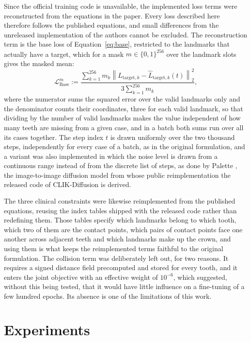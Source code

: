 \documentclass[10pt,a4paper]{article}
\begin{document}
Since the official training code is unavailable, the implemented loss terms were reconstructed from the equations in the paper. Every loss described here therefore follows the published equations, and small differences from the unreleased implementation of the authors cannot be excluded. The reconstruction term is the base loss of Equation~\eqref{eq:base}, restricted to the landmarks that actually have a target, which for a mask $m \in \{0,1\}^{256}$ over the landmark slots gives the masked mean:
\begin{equation}
\mathcal{L}^{m}_{\text{Base}} := \frac{\sum_{k=1}^{256} m_k \left\lVert L_{\text{target},k} - \hat{L}_{\text{target},k}(t)\right\rVert_2^2}{3\sum_{k=1}^{256} m_k},
\end{equation}
where the numerator sums the squared error over the valid landmarks only and the denominator counts their coordinates, three for each valid landmark, so that dividing by the number of valid landmarks makes the value independent of how many teeth are missing from a given case, and in a batch both sums run over all its cases together. The step index $t$ is drawn uniformly over the two thousand steps, independently for every case of a batch, as in the original formulation, and a variant was also implemented in which the noise level is drawn from a continuous range instead of from the discrete list of steps, as done by Palette \citep{saharia2022palette}, the image-to-image diffusion model from whose public reimplementation the released code of CLIK-Diffusion is derived.

The three clinical constraints were likewise reimplemented from the published equations, reusing the index tables shipped with the released code rather than redefining them. Those tables specify which landmarks belong to which tooth, which two of them are the contact points, which pairs of contact points face one another across adjacent teeth and which landmarks make up the crown, and using them is what keeps the reimplemented terms faithful to the original formulation. The collision term was deliberately left out, for two reasons. It requires a signed distance field precomputed and stored for every tooth, and it enters the joint objective with an effective weight of $10^{-6}$, which suggested, without this being tested, that it would have little influence on a fine-tuning of a few hundred epochs. Its absence is one of the limitations of this work.


\section{Experiments}
\end{document}

